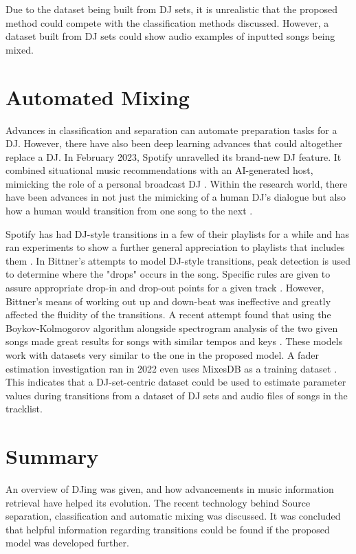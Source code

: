 Due to the dataset being built from DJ sets, it is unrealistic that the proposed method could compete with the classification methods discussed. However, a dataset built from DJ sets could show audio examples of inputted songs being mixed.

\section{Automated Mixing}
Advances in classification and separation can automate preparation tasks for a DJ. However, there have also been deep learning advances that could altogether replace a DJ. In February 2023, Spotify unravelled its brand-new DJ feature. It combined situational music recommendations with an AI-generated host, mimicking the role of a personal broadcast DJ \citep{naomi_spotify_2023}. Within the research world, there have been advances in not just the mimicking of a human DJ's dialogue but also how a human would transition from one song to the next \citep{chen_automatic_2022}.

Spotify has had DJ-style transitions in a few of their playlists for a while and has ran experiments to show a further general appreciation to playlists that includes them \citep{bittner_automatic_2017}. In Bittner's attempts to model DJ-style transitions, peak detection is used to determine where the "drops" occurs in the song. Specific rules are given to assure appropriate drop-in and drop-out points for a given track \citep{bittner_automatic_2017}.  However, Bittner's means of working out up and down-beat was ineffective and greatly affected the fluidity of the transitions. A recent attempt found that using the Boykov-Kolmogorov algorithm alongside spectrogram analysis of the two given songs made great results for songs with similar tempos and keys \citep{robinson_automated_2023}. These models work with datasets very similar to the one in the proposed model. A fader estimation investigation ran in 2022 even uses MixesDB as a training dataset \citep{kim_joint_2022}. This indicates that a DJ-set-centric dataset could be used to estimate parameter values during transitions from a dataset of DJ sets and audio files of songs in the tracklist.

\section{Summary}
An overview of DJing was given, and how advancements in music information retrieval have helped its evolution. The recent technology behind Source separation, classification and automatic mixing was discussed. It was concluded that helpful information regarding transitions could be found if the proposed model was developed further.

